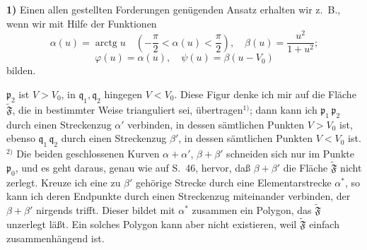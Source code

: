 \documentclass{article}
\begin{document}
\textbf{1)} Einen allen gestellten Forderungen genügenden Ansatz erhalten wir z.~B., wenn wir mit Hilfe der Funktionen
\[ \alpha(u) = \operatorname{arctg} u \quad \left( -\frac{\pi}{2} < \alpha(u) < \frac{\pi}{2} \right), \quad \beta(u) = \frac{u^2}{1 + u^2}; \]
\[ \varphi(u) = \alpha(u), \quad \psi(u) = \beta(u - V_0) \]
bilden.

$\mathfrak{p}_2$ ist $V > V_0$, in $\mathfrak{q}_1, \mathfrak{q}_2$ hingegen $V < V_0$. Diese Figur denke ich mir auf die Fläche $\widetilde{\mathfrak{F}}$, die in bestimmter Weise trianguliert sei, übertragen${}^{1)}$; dann kann ich $\mathfrak{p}_1\,\mathfrak{p}_2$ durch einen Streckenzug $\alpha'$ verbinden, in dessen sämtlichen Punkten $V > V_0$ ist, ebenso $\mathfrak{q}_1\,\mathfrak{q}_2$ durch einen Streckenzug $\beta'$, in dessen sämtlichen Punkten $V < V_0$ ist.${}^{2)}$ Die beiden geschlossenen Kurven $\alpha + \alpha'$, $\beta + \beta'$ schneiden sich nur im Punkte $\mathfrak{p}_0$, und es geht daraus, genau wie auf S.~46, hervor, daß $\beta + \beta'$ die Fläche $\widetilde{\mathfrak{F}}$ nicht zerlegt. Kreuze ich eine zu $\beta'$ gehörige Strecke durch eine Elementarstrecke $\alpha^*$, so kann ich deren Endpunkte durch einen Streckenzug miteinander verbinden, der $\beta + \beta'$ nirgends trifft. Dieser bildet mit $\alpha^*$ zusammen ein Polygon, das $\widetilde{\mathfrak{F}}$ unzerlegt läßt. Ein solches Polygon kann aber nicht existieren, weil $\widetilde{\mathfrak{F}}$ einfach zusammenhängend ist.

\end{document}
